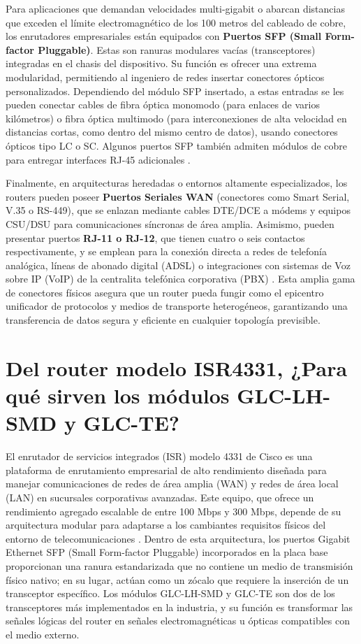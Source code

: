 \documentclass[a4paper,12pt]{article}
\begin{document}
Para aplicaciones que demandan velocidades multi-gigabit o abarcan distancias que exceden el límite electromagnético de los 100 metros del cableado de cobre, los enrutadores empresariales están equipados con \textbf{Puertos SFP (Small Form-factor Pluggable)}. Estas son ranuras modulares vacías (transceptores) integradas en el chasis del dispositivo. Su función es ofrecer una extrema modularidad, permitiendo al ingeniero de redes insertar conectores ópticos personalizados. Dependiendo del módulo SFP insertado, a estas entradas se les pueden conectar cables de fibra óptica monomodo (para enlaces de varios kilómetros) o fibra óptica multimodo (para interconexiones de alta velocidad en distancias cortas, como dentro del mismo centro de datos), usando conectores ópticos tipo LC o SC. Algunos puertos SFP también admiten módulos de cobre para entregar interfaces RJ-45 adicionales \cite{cisco_4331_datasheet}.

Finalmente, en arquitecturas heredadas o entornos altamente especializados, los routers pueden poseer \textbf{Puertos Seriales WAN} (conectores como Smart Serial, V.35 o RS-449), que se enlazan mediante cables DTE/DCE a módems y equipos CSU/DSU para comunicaciones síncronas de área amplia. Asimismo, pueden presentar puertos \textbf{RJ-11 o RJ-12}, que tienen cuatro o seis contactos respectivamente, y se emplean para la conexión directa a redes de telefonía analógica, líneas de abonado digital (ADSL) o integraciones con sistemas de Voz sobre IP (VoIP) de la centralita telefónica corporativa (PBX) \cite{router_ports_guide}. Esta amplia gama de conectores físicos asegura que un router pueda fungir como el epicentro unificador de protocolos y medios de transporte heterogéneos, garantizando una transferencia de datos segura y eficiente en cualquier topología previsible.

\section{Del router modelo ISR4331, ¿Para qué sirven los módulos GLC-LH-SMD y GLC-TE?}

El enrutador de servicios integrados (ISR) modelo 4331 de Cisco es una plataforma de enrutamiento empresarial de alto rendimiento diseñada para manejar comunicaciones de redes de área amplia (WAN) y redes de área local (LAN) en sucursales corporativas avanzadas. Este equipo, que ofrece un rendimiento agregado escalable de entre 100 Mbps y 300 Mbps, depende de su arquitectura modular para adaptarse a los cambiantes requisitos físicos del entorno de telecomunicaciones \cite{cisco_4331_datasheet}. Dentro de esta arquitectura, los puertos Gigabit Ethernet SFP (Small Form-factor Pluggable) incorporados en la placa base proporcionan una ranura estandarizada que no contiene un medio de transmisión físico nativo; en su lugar, actúan como un zócalo que requiere la inserción de un transceptor específico. Los módulos GLC-LH-SMD y GLC-TE son dos de los transceptores más implementados en la industria, y su función es transformar las señales lógicas del router en señales electromagnéticas u ópticas compatibles con el medio externo.
\end{document}
